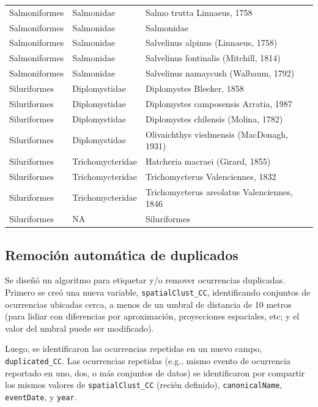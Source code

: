 \documentclass[sn-apa,pdflatex]{sn-jnl}
\begin{document}
\begin{longtable}[t]{>{\raggedright\arraybackslash}p{10em}>{\raggedright\arraybackslash}p{10em}>{\raggedright\arraybackslash}p{28em}}
Salmoniformes & Salmonidae & Salmo trutta Linnaeus, 1758\\
Salmoniformes & Salmonidae & Salmonidae\\
Salmoniformes & Salmonidae & Salvelinus alpinus (Linnaeus, 1758)\\
Salmoniformes & Salmonidae & Salvelinus fontinalis (Mitchill, 1814)\\
\addlinespace
Salmoniformes & Salmonidae & Salvelinus namaycush (Walbaum, 1792)\\
Siluriformes & Diplomystidae & Diplomystes Bleeker, 1858\\
Siluriformes & Diplomystidae & Diplomystes camposensis Arratia, 1987\\
Siluriformes & Diplomystidae & Diplomystes chilensis (Molina, 1782)\\
Siluriformes & Diplomystidae & Olivaichthys viedmensis (MacDonagh, 1931)\\
\addlinespace
Siluriformes & Trichomycteridae & Hatcheria macraei (Girard, 1855)\\
Siluriformes & Trichomycteridae & Trichomycterus Valenciennes, 1832\\
Siluriformes & Trichomycteridae & Trichomycterus areolatus Valenciennes, 1846\\
Siluriformes & NA & Siluriformes\\
\bottomrule
\end{longtable}
\endgroup{}

\subsection{Remoción automática de
duplicados}\label{remociuxf3n-automuxe1tica-de-duplicados}

Se diseñó un algoritmo para etiquetar y/o remover ocurrencias
duplicadas. Primero se creó una nueva variable,
\texttt{spatialClust\_CC}, identificando conjuntos de ocurrencias
ubicadas cerca, a menos de un umbral de distancia de 10 metros (para
lidiar con diferencias por aproximación, proyecciones espaciales, etc; y
el valor del umbral puede ser modificado).

Luego, se identificaron las ocurrencias repetidas en un nuevo campo,
\texttt{duplicated\_CC}. Las ocurrencias repetidas (e.g., mismo evento
de ocurrencia reportado en uno, dos, o más conjuntos de datos) se
identificaron por compartir los mismos valores de
\texttt{spatialClust\_CC} (recién definido), \texttt{canonicalName},
\texttt{eventDate}, y \texttt{year}.
\end{document}
